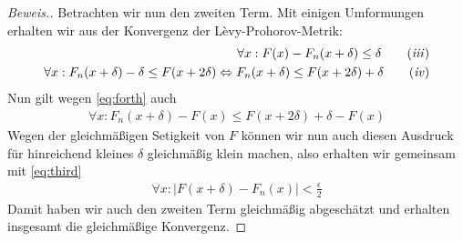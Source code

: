\begin{proof}[Beweis.]
Betrachten wir nun den zweiten Term. Mit einigen Umformungen erhalten wir aus der Konvergenz der Lèvy-Prohorov-Metrik:
\begin{align*}
 \forall x: F(x) - F_n(x + \delta) \leq \delta \tag{\textit{iii}} \label{eq:third} \\
 \forall x: F_n(x+\delta)-\delta\leq F(x+2\delta)\Leftrightarrow F_n(x+\delta)\leq F(x+2\delta)+\delta\tag{\textit{iv}} \label{eq:forth} \\
\end{align*}
Nun gilt wegen \eqref{eq:forth}
auch
\begin{align*}
  \forall x: F_n(x+\delta)-F(x)\leq F(x+2\delta)+\delta-F(x)
\end{align*}
Wegen der gleichmäßigen Setigkeit von $F$ können wir nun auch diesen Ausdruck für hinreichend kleines $\delta$ gleichmäßig klein machen, also erhalten wir gemeinsam mit \eqref{eq:third}
\begin{align*}
  \forall x:\vert F(x+\delta)-F_n(x)\vert<\frac{\epsilon}{2}
\end{align*}
Damit haben wir auch den zweiten Term gleichmäßig abgeschätzt und erhalten insgesamt die gleichmäßige Konvergenz.
\end{proof}
